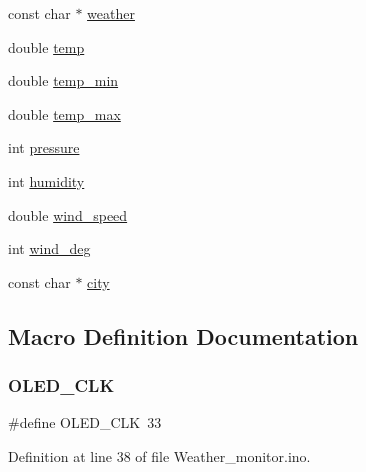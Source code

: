 \begin{DoxyCompactItemize}
const char $\ast$ \hyperlink{_weather__monitor_8ino_a3f5ff30909a7914cb8eb33a054f67722}{weather}
\item 
double \hyperlink{_weather__monitor_8ino_a9fb78358ae4b0a049a0d1b37dc4cffec}{temp}
\item 
double \hyperlink{_weather__monitor_8ino_a19e734a068d8a801de60c91fd69bc065}{temp\+\_\+min}
\item 
double \hyperlink{_weather__monitor_8ino_a73dae65344123317a4a416e34b6cc29d}{temp\+\_\+max}
\item 
int \hyperlink{_weather__monitor_8ino_ad19429a485400193c6dfc8c71b151c06}{pressure}
\item 
int \hyperlink{_weather__monitor_8ino_a405f237eaa8a513a9682fbb6e44c4860}{humidity}
\item 
double \hyperlink{_weather__monitor_8ino_a01a62de6de3acaa68a34a386b9c374a7}{wind\+\_\+speed}
\item 
int \hyperlink{_weather__monitor_8ino_a1dfaa72d9fe500cb55105c1bbe92b327}{wind\+\_\+deg}
\item 
const char $\ast$ \hyperlink{_weather__monitor_8ino_aa69b2105b445fb74380087765ddab644}{city}
\end{DoxyCompactItemize}


\subsection{Macro Definition Documentation}
\mbox{\label{_weather__monitor_8ino_a8ada351153327868280ab3e62367f927}} 
\subsubsection{\texorpdfstring{O\+L\+E\+D\+\_\+\+C\+LK}{OLED\_CLK}}
{\footnotesize\ttfamily \#define O\+L\+E\+D\+\_\+\+C\+LK~33}



Definition at line 38 of file Weather\+\_\+monitor.\+ino.

\mbox{\label{_weather__monitor_8ino_ab68a9b3dbffcafd9849e74c4998b8840}} 
